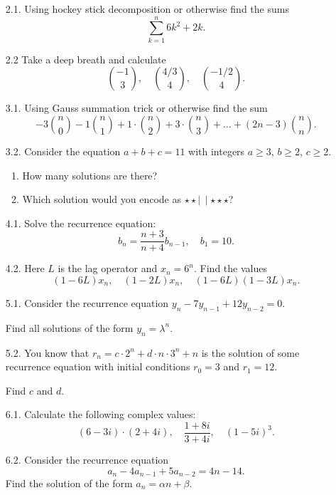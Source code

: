 \documentclass[12pt]{article}
\begin{document}




\begin{enumerate} 
    \item[2.1.] Using hockey stick decomposition or otherwise find the sums
    \[
    \sum_{k=1}^{n} {6k^2 + 2k}.
    \]

    \item[2.2] Take a deep breath and calculate 
\[
{-1 \choose 3},\quad  {4/3 \choose 4}, \quad  {-1/2 \choose 4}. 
\]


    \item[3.1.] Using Gauss summation trick or otherwise find the sum 
    \[
    -3{n\choose 0} -1 {n \choose 1} +1 \cdot {n \choose 2} + 3 \cdot {n \choose 3} + \dots + (2n - 3) {n \choose n}.
    \]
    \item[3.2.] Consider the equation $a + b + c = 11$ with integers $a \geq 3$, $b \geq 2$, $c\geq 2$.

    \begin{enumerate}
        \item How many solutions are there?
        \item Which solution would you encode as $\star \star \mid \, \mid \star\star\star$?
    \end{enumerate}

    \item[4.1.] Solve the recurrence equation:
    \[
    b_n = \frac{n + 3}{n + 4} b_{n-1}, \quad b_1 = 10.
    \]
    \item[4.2.] Here $L$ is the lag operator and $x_n = 6^n$. 
    Find the values
    \[
    (1 - 6L) x_n, \quad (1 - 2L)x_n, \quad (1-6L)(1 - 3L)x_n.
    \]


    \item[5.1.] Consider the recurrence equation $y_n - 7 y_{n-1} + 12 y_{n-2} = 0$.
    
    Find all solutions of the form $y_n = \lambda^n$.
    \item[5.2.] You know that $r_n = c \cdot 2^n + d \cdot n \cdot 3^n + n$ is the solution of some recurrence equation with initial conditions  $r_0 = 3$ and $r_1 = 12$.
    
    Find $c$ and $d$. 

    \item[6.1.] Calculate the following complex values: 
    \[
    (6 - 3i) \cdot (2 + 4i), \quad \frac{1 + 8i}{3 + 4i}, \quad (1 - 5i)^3.
    \]
    \item[6.2.] Consider the recurrence equation
    \[
    a_n - 4 a_{n-1} + 5 a_{n-2} = 4 n -14.
    \] 
    Find the solution of the form $a_n = \alpha n + \beta$.



\end{enumerate}
\end{document}
